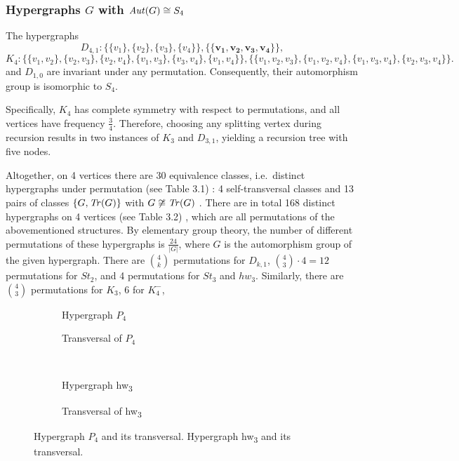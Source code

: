 \subsubsection*{Hypergraphs $G$ with $\mathit{Aut}(G)\cong S_4$}

The hypergraphs
\[
D_{4,1}:\{\{v_1\},\{v_2\},\{v_3\},\{v_4\}\},\{\{\mathbf{v_1},\mathbf{v_2},\mathbf{v_3},\mathbf{v_4}\}\},
\]
\[
K_4:\{\{v_1,v_2\},\{v_2,v_3\},\{v_2,v_4\},\{v_1,v_3\},\{v_3,v_4\},\{v_1,v_4\}\},\{\{v_1,v_2,v_3\},\{v_1,v_2,v_4\},\{v_1,v_3,v_4\},\{v_2,v_3,v_4\}\}.
\]
and $D_{1,0}$ are invariant under any permutation. Consequently, their automorphism group is isomorphic to $S_4$.

Specifically, $K_4$ has complete symmetry with respect to permutations, and all vertices have frequency $\frac{3}{4}$. Therefore, choosing any splitting vertex during recursion results in two instances of $K_3$ and $D_{3,1}$, yielding a recursion tree with five nodes.

Altogether, on 4 vertices there are 30 equivalence classes, i.e.\ distinct hypergraphs under permutation (see Table 3.1) : 4 self-transversal classes and 13 pairs of classes $\{G,\mathit{Tr}(G)\}$ with $G\not\cong\mathit{Tr}(G)$ . There are in total 168 distinct hypergraphs on 4 vertices (see Table 3.2) , which are all permutations of the abovementioned structures. By elementary group theory, the number of different permutations of these hypergraphs is $\frac{24}{|G|}$, where $G$ is the automorphism group of the given hypergraph. There are $\binom{4}{k}$ permutations for $D_{k,1}$, $\binom{4}{3}\cdot 4=12$ permutations for $St_2$, and 4 permutations for $St_3$ and $hw_3$. Similarly, there are $\binom{4}{3}$ permutations for $K_3$, 6 for $K_4^-$,

\begin{figure}[tp]
\centering
\begin{subfigure}{0.45\linewidth}\centering\caption{Hypergraph $P_4$}\end{subfigure}\hfill
\begin{subfigure}{0.45\linewidth}\centering\caption{Transversal of $P_4$}\end{subfigure}\\[8pt]
\begin{subfigure}{0.45\linewidth}\centering\caption{Hypergraph hw\textsubscript{3}}\end{subfigure}\hfill
\begin{subfigure}{0.45\linewidth}\centering\caption{Transversal of hw\textsubscript{3}}\end{subfigure}
\caption{Hypergraph $P_4$ and its transversal. Hypergraph hw\textsubscript{3} and its transversal.}\label{fig:p4-hw3}
\end{figure}

